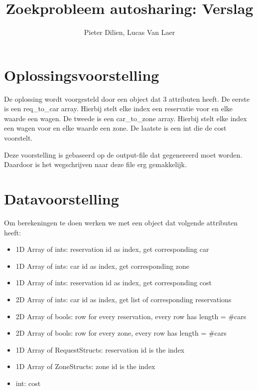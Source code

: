 \documentclass[a4paper, 11pt, one column]{article}
\title{Zoekprobleem autosharing: Verslag}
\author{Pieter Dilien, Lucas Van Laer}
\begin{document}
\maketitle

\section{Oplossingsvoorstelling}
De oplossing wordt voorgesteld door een object dat 3 attributen heeft. De eerste is een req\_to\_car array. Hierbij stelt elke index een reservatie voor en elke waarde een wagen. De tweede is een car\_to\_zone array. Hierbij stelt elke index een wagen voor en elke waarde een zone. De laatste is een int die de cost voorstelt.


Deze voorstelling is gebaseerd op de output-file dat gegenereerd moet worden. Daardoor is het wegschrijven naar deze file erg gemakkelijk.

\section{Datavoorstelling}
Om berekeningen te doen werken we met een object dat volgende attributen heeft:
\begin{itemize}
    \item 1D Array of ints: reservation id as index, get corresponding car
    \item 1D Array of ints: car id as index, get corresponding zone
    \item 1D Array of ints: reservation id as index, get corresponding cost
    \item 2D Array of ints: car id as index, get list of corresponding reservations
    \item 2D Array of bools: row for every reservation, every row has length = \#cars
    \item 2D Array of bools: row for every zone, every row has length = \#cars
    \item 1D Array of RequestStructs: reservation id is the index
    \item 1D Array of ZoneStructs: zone id is the index
    \item int: cost
\end{itemize}
\end{document}
